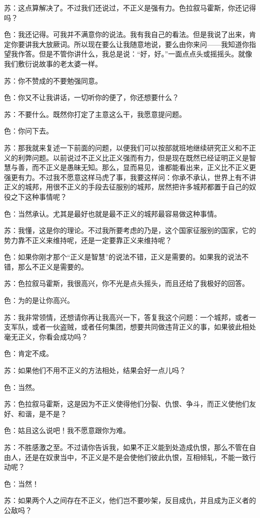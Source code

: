 \documentclass[12pt,oneside]{book}
\begin{document}
苏：这点算解决了。不过我们还说过，不正义是强有力。色拉叙马霍斯，你还记得吗？

色：我还记得。可我并不满意你的说法。我有我自己的看法。但是我说了出来，肯定你要讲我大放厥词。所以现在要么让我随意地说，要么由你来问——我知道你指望我作答。但是不管你讲什么，我总是说：“好，好。”一面点点头或摇摇头。就像我们敷衍说故事的老太婆一样。

苏：你不赞成的不要勉强同意。

色：你又不让我讲话，一切听你的便了，你还想要什么？

苏：不要什么。既然你打定了主意这么干，我愿意提问题。

色：你问下去。

苏：那我就来复述一下前面的问题，以便我们可以按部就班地继续研究正义和不正义的利弊问题。以前说过不正义比正义强而有力，但是现在既然已经证明正义是智慧与善，而不正义是愚昧无知。那么，显而易见，谁都能看出来，正义比不正义更强更有力。不过我不愿意这样马虎了事，我要这样问：你承不承认，世界上有不讲正义的城邦，用很不正义的手段去征服别的城邦，居然把许多城邦都置于自己的奴役之下这种事情呢？

色：当然承认。尤其是最好也就是最不正义的城邦最容易做这种事情。

苏：我懂，这是你的理论。不过我所要考虑的乃是，这个国家征服别的国家，它的势力靠不正义来维持呢，还是一定要靠正义来维持呢？

色：如果你刚才那个“正义是智慧”的说法不错，正义是需要的。如果我的说法不错，那么不正义是需要的。

苏：色拉叙马霍斯，我很高兴，你不光是点头摇头，而且还给了我极好的回答。

色：为的是让你高兴。

苏：我非常领情，还想请你再让我高兴一下，答复我这个问题：一个城邦，或者一支军队，或者一伙盗贼，或者任何集团，想要共同做违背正义的事，如果彼此相处毫无正义，你看会成功吗？

色：肯定不成。

苏：如果他们不用不正义的方法相处，结果会好一点儿吗？

色：当然。

苏：色拉叙马霍斯，这是因为不正义使得他们分裂、仇恨、争斗，而正义使他们友好、和谐，是不是？

色：姑且这么说吧！我不愿意跟你为难。

苏：不胜感激之至。不过请你告诉我，如果不正义能到处造成仇恨，那么不管在自由人，还是在奴隶当中，不正义是不是会使他们彼此仇恨，互相倾轧，不能一致行动呢？

色：当然！

苏：如果两个人之间存在不正义，他们岂不要吵架，反目成仇，并且成为正义者的公敌吗？
\end{document}
